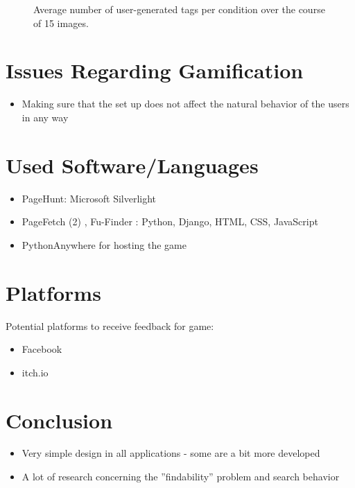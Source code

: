 \documentclass{article}
\theoremstyle{definition}
\theoremstyle{remark}
\begin{document}
\begin{itemize}
\begin{itemize}
\begin{itemize}
\begin{figure}[h!]
                \caption{Average number of user-generated tags per condition over the course of 15 images. \cite{game_elements}}
                \label{fig:game_elements}
            \end{figure} 
        \end{itemize}
    \end{itemize}
\end{itemize}

\newpage

\section{Issues Regarding Gamification}
\begin{itemize}
    \item Making sure that the set up does not affect the natural behavior of the users in any way
\end{itemize}

\section{Used Software/Languages}
\begin{itemize}
    \item PageHunt: Microsoft Silverlight \cite{search_engines}
    \item PageFetch (2) \cite{pagefetch, pagefetch2}, Fu-Finder \cite{fufinder}: Python, Django, HTML, CSS, JavaScript
    \item PythonAnywhere for hosting the game
\end{itemize}

\section{Platforms}
Potential platforms to receive feedback for game:
\begin{itemize}
    \item Facebook
    \item itch.io
\end{itemize}

\section{Conclusion}
\begin{itemize}
    \item Very simple design in all applications - some are a bit more developed
    \item A lot of research concerning  the ''findability'' problem and search behavior
\end{itemize}
\end{document}
